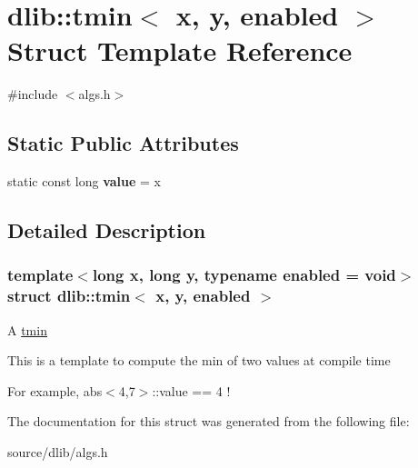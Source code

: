 \hypertarget{structdlib_1_1tmin}{
\section{dlib::tmin$<$ x, y, enabled $>$ Struct Template Reference}
\label{structdlib_1_1tmin}
}


{\ttfamily \#include $<$algs.h$>$}\subsection*{Static Public Attributes}
\begin{DoxyCompactItemize}
\item 
\hypertarget{structdlib_1_1tmin_aa27a360ada93cb896c0beab29281eb5e}{
static const long {\bfseries value} = x}
\label{structdlib_1_1tmin_aa27a360ada93cb896c0beab29281eb5e}

\end{DoxyCompactItemize}


\subsection{Detailed Description}
\subsubsection*{template$<$long x, long y, typename enabled = void$>$ struct dlib::tmin$<$ x, y, enabled $>$}

A \hyperlink{structdlib_1_1tmin}{tmin}

This is a template to compute the min of two values at compile time

For example, abs$<$4,7$>$::value == 4 ! 

The documentation for this struct was generated from the following file:\begin{DoxyCompactItemize}
\item 
source/dlib/algs.h\end{DoxyCompactItemize}
